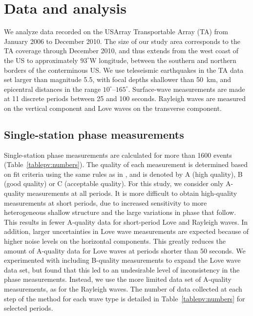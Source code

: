 \documentclass[12pt,oneside]{book}
\newcommand{\degree}[1]{\mbox{$#1^{\circ}$}}
\begin{document}
\section{Data and analysis}
We analyze data recorded on the USArray Transportable Array (TA) from January 2006 to December 2010. The size of our study area corresponds to the TA coverage through December 2010, and thus extends from the west coast of the US to approximately \degree{93}W longitude, between the southern and northern borders of the conterminous US. We use teleseismic earthquakes in the TA data set larger than magnitude 5.5, with focal depths shallower than 50~km, and epicentral distances in the range \degree{10}\nobreakdash--\degree{165}. Surface-wave measurements are made at 11 discrete periods between 25 and 100 seconds. Rayleigh waves are measured on the vertical component and Love waves on the transverse component.

\subsection{Single-station phase measurements}
Single-station phase measurements are calculated for more than 1600 events (Table~\ref{tablepv:numbers}). The quality of each measurement is determined based on fit criteria using the same rules as in \citet{Ekstrom1997}, and is denoted by A (high quality), B (good quality) or C (acceptable quality). For this study, we consider only A\nobreakdash-quality measurements at all periods. It is more difficult to obtain high-quality measurements at short periods, due to increased sensitivity to more heterogeneous shallow structure and the large variations in phase that follow. This results in fewer A\nobreakdash-quality data for short-period Love and Rayleigh waves. In addition, larger uncertainties in Love wave measurements are expected because of higher noise levels on the horizontal components. This greatly reduces the amount of A\nobreakdash-quality data for Love waves at periods shorter than 50 seconds. We experimented with including B\nobreakdash-quality measurements to expand the Love wave data set, but found that this led to an undesirable level of inconsistency in the phase measurements. Instead, we use the more limited data set of A\nobreakdash-quality measurements, as for the Rayleigh waves. The number of data collected at each step of the method for each wave type is detailed in Table~\ref{tablepv:numbers} for selected periods. 
\end{document}
